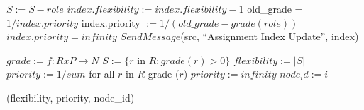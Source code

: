 \documentclass[11pt]{article}
\begin{document}
\begin{algorithmic}
		\State $S := S - role$
		\State $index.flexibility := index.flexibility - 1$
			\State old\_grade = $1 / index.priority$
			\State index.priority $:= 1 / (old\_grade - grade(role))$
		\Else
			\State $index.priority = infinity$
		\EndIf
	\EndIf
	\State $SendMessage$(src, ``Assignment Index Update'', index)
\EndFunction
\end{algorithmic}	

\begin{algorithmic}
	\State $grade :=  f: R x P \rightarrow N$
	\State $S := \{r$ in $R :  grade (r) > 0\}$
        \State $flexibility := | S |$
        		\State $priority := 1 / sum$ for all $r$ in $R$ grade ($r$)
	\Else
		\State $ priority := infinity$
        \EndIf
        \State $node_id := i$
        
	\Return (flexibility, priority, node\_id)
\EndFunction
\end{algorithmic}	
\end{document}
